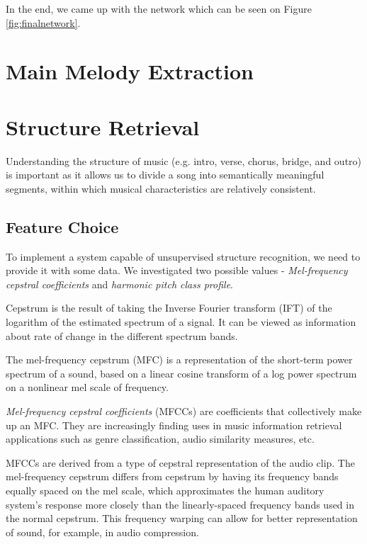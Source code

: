In the end, we came up with the network which can be seen on Figure \ref{fig:finalnetwork}.

\vspace{20pt}

\section{Main Melody Extraction}

\vspace{10pt}

\section{Structure Retrieval}

Understanding the structure of music (e.g. intro, verse, chorus, bridge, and outro) is important as it allows us to divide a song into semantically meaningful segments, within which musical characteristics are relatively consistent.

\vspace{10pt}

\subsection{Feature Choice}

To implement a system capable of unsupervised structure recognition, we need to provide it with some data. We investigated two possible values - \textit{Mel-frequency cepstral coefficients} and \textit{harmonic pitch class profile}.

Cepstrum is the result of taking the Inverse Fourier transform (IFT) of the logarithm of the estimated spectrum of a signal. It can be viewed as information about rate of change in the different spectrum bands.

The mel-frequency cepstrum (MFC) is a representation of the short-term power spectrum of a sound, based on a linear cosine transform of a log power spectrum on a nonlinear mel scale of frequency.

\textit{Mel-frequency cepstral coefficients} (MFCCs) are coefficients that collectively make up an MFC. They are increasingly finding uses in music information retrieval applications such as genre classification, audio similarity measures, etc.

MFCCs are derived from a type of cepstral representation of the audio clip. The mel-frequency cepstrum differs from cepstrum by having its frequency bands equally spaced on the mel scale, which approximates the human auditory system's response more closely than the linearly-spaced frequency bands used in the normal cepstrum. This frequency warping can allow for better representation of sound, for example, in audio compression.

